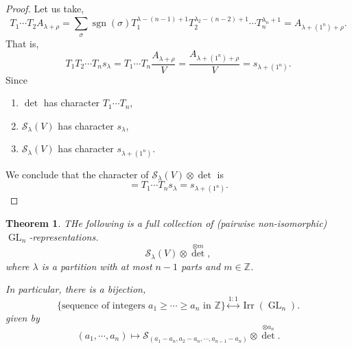 \documentclass[10pt]{article}
\newtheorem{theorem}{Theorem} [section]
\numberwithin{equation}{theorem}
\DeclareMathOperator{\Irr}{Irr}
\DeclareMathOperator{\GL}{GL}
\DeclareMathOperator{\sgn}{sgn}
\newcommand{\Z}[0]{\mathbb{Z}}
\begin{document}
\begin{proof}
  Let us take,
  \begin{equation*}
    T_1\cdots T_2 A_{\lambda+\rho} = \sum_{\sigma}\sgn(\sigma)T_1^{\lambda-(n-1)+1}T_2^{\lambda_2-(n-2)+1}\cdots T_n^{\lambda_n+1} = A_{\lambda+(1^n)+\rho}.
  \end{equation*}
  That is,
  \begin{equation*}
    T_1T_2\cdots T_ns_\lambda = T_1\cdots T_n{\frac {A_{\lambda+\rho}} V} = {\frac {A_{\lambda+(1^n)+\rho}} V} = s_{\lambda+(1^n)}. 
  \end{equation*}
  Since 
  \begin{enumerate}
    \item $\det$ has character $T_1\cdots T_n$,
    \item $\mathcal{S}_\lambda(V)$ has character $s_\lambda$,
    \item $\mathcal{S}_\lambda(V)$ has character $s_{\lambda+(1^n)}$.
  \end{enumerate}
  We conclude that the character of $\mathcal{S}_\lambda(V)\otimes \det$ is 
  \begin{equation*}
     = T_1\cdots T_n s_\lambda  = s_{\lambda+(1^n)}.
  \end{equation*}
\end{proof}
\begin{theorem}
  \label{theorem_4_12}
  THe following is a full collection of (pairwise non-isomorphic) $\GL_n$-representations. 
  \begin{equation*}
    \mathcal{S}_\lambda(V)\otimes{\det}^{\otimes m},
  \end{equation*}
  where $\lambda$ is a partition with at most $n-1$ parts and $m\in\Z$.\\
  \par In particular, there is a bijection,
  \begin{equation*}
    \{\text{sequence of integers $a_1\geq \cdots\geq a_n$ in $\Z$}\}\stackrel{1:1}{\leftrightarrow}\Irr(\GL_n).
  \end{equation*}
  given by 
  \begin{equation*}
    (a_1,\cdots,a_n)\mapsto \mathcal{S}_{(a_1-a_n,a_2-a_n,\cdots,a_{n-1}-a_n)}\otimes {\det}^{\otimes a_n}.
  \end{equation*}
\end{theorem}
\end{document}
